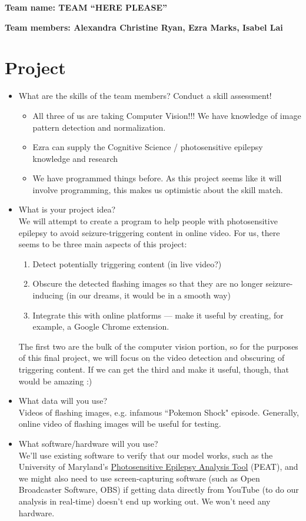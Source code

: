 \textbf{Team name: TEAM ``HERE PLEASE''}

\textbf{Team members: Alexandra Christine Ryan, Ezra Marks, Isabel Lai}\\

\section*{Project}
\begin{itemize}

\item What are the skills of the team members? Conduct a skill assessment!
\begin{itemize}
\item All three of us are taking Computer Vision!!! We have knowledge of image pattern detection and normalization.
\item Ezra can supply the Cognitive Science / photosensitive epilepsy knowledge and research
\item We have programmed things before. As this project seems like it will involve programming, this makes us optimistic about the skill match.

\end{itemize}
\item What is your project idea? \\
We will attempt to create a program to help people with photosensitive epilepsy to avoid seizure-triggering content in online video. For us, there seems to be three main aspects of this project:
\begin{enumerate}
    \item Detect potentially triggering content (in live video?)
    \item Obscure the detected flashing images so that they are no longer seizure-inducing (in our dreams, it would be in a smooth way)
    \item Integrate this with online platforms --- make it useful by creating, for example, a Google Chrome extension.
\end{enumerate}

The first two are the bulk of the computer vision portion, so for the purposes of this final project, we will focus on the video detection and obscuring of triggering content. If we can get the third and make it useful, though, that would be amazing :)

\item What data will you use? \\
Videos of flashing images, e.g. infamous ``Pokemon Shock" episode. Generally, online video of flashing images will be useful for testing.
\item What software/hardware will you use? \\
We'll use existing software to verify that our model works, such as the University of Maryland's \href{https://trace.umd.edu/peat}{Photosensitive Epilepsy Analysis Tool} (PEAT), and we might also need to use screen-capturing software (such as Open Broadcaster Software, OBS) if getting data directly from YouTube (to do our analysis in real-time) doesn't end up working out. We won't need any hardware. 


\end{itemize}

